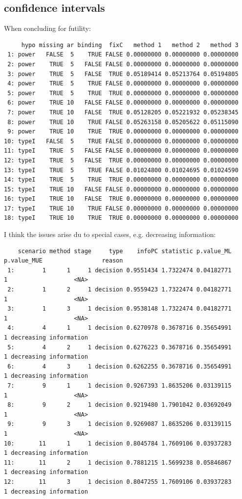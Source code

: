 \documentclass[12pt]{article}
\begin{document}
\clearpage

\subsection{confidence intervals}
\label{sec:org68589e6}

When concluding for futility:
\begin{verbatim}
     hypo missing ar binding  fixC   method 1   method 2   method 3
 1: power   FALSE  5    TRUE FALSE 0.00000000 0.00000000 0.00000000
 2: power    TRUE  5   FALSE FALSE 0.00000000 0.00000000 0.00000000
 3: power    TRUE  5   FALSE  TRUE 0.05189414 0.05213764 0.05194805
 4: power    TRUE  5    TRUE FALSE 0.00000000 0.00000000 0.00000000
 5: power    TRUE  5    TRUE  TRUE 0.00000000 0.00000000 0.00000000
 6: power    TRUE 10   FALSE FALSE 0.00000000 0.00000000 0.00000000
 7: power    TRUE 10   FALSE  TRUE 0.05128205 0.05221932 0.05238345
 8: power    TRUE 10    TRUE FALSE 0.05263158 0.05205622 0.05115090
 9: power    TRUE 10    TRUE  TRUE 0.00000000 0.00000000 0.00000000
10: typeI   FALSE  5    TRUE FALSE 0.00000000 0.00000000 0.00000000
11: typeI    TRUE  5   FALSE FALSE 0.00000000 0.00000000 0.00000000
12: typeI    TRUE  5   FALSE  TRUE 0.00000000 0.00000000 0.00000000
13: typeI    TRUE  5    TRUE FALSE 0.01024800 0.01024695 0.01024590
14: typeI    TRUE  5    TRUE  TRUE 0.00000000 0.00000000 0.00000000
15: typeI    TRUE 10   FALSE FALSE 0.00000000 0.00000000 0.00000000
16: typeI    TRUE 10   FALSE  TRUE 0.00000000 0.00000000 0.00000000
17: typeI    TRUE 10    TRUE FALSE 0.00000000 0.00000000 0.00000000
18: typeI    TRUE 10    TRUE  TRUE 0.00000000 0.00000000 0.00000000
\end{verbatim}

I think the issues arise du to special cases, e.g. decreasing
information:
\begin{verbatim}
    scenario method stage     type    infoPC statistic p.value_ML p.value_MUE                 reason
 1:        1      1     1 decision 0.9551434 1.7322474 0.04182771           1                   <NA>
 2:        1      2     1 decision 0.9559423 1.7322474 0.04182771           1                   <NA>
 3:        1      3     1 decision 0.9538148 1.7322474 0.04182771           1                   <NA>
 4:        4      1     1 decision 0.6270978 0.3678716 0.35654991           1 decreasing information
 5:        4      2     1 decision 0.6276223 0.3678716 0.35654991           1 decreasing information
 6:        4      3     1 decision 0.6262255 0.3678716 0.35654991           1 decreasing information
 7:        9      1     1 decision 0.9267393 1.8635206 0.03139115           1                   <NA>
 8:        9      2     1 decision 0.9219480 1.7901042 0.03692049           1                   <NA>
 9:        9      3     1 decision 0.9269087 1.8635206 0.03139115           1                   <NA>
10:       11      1     1 decision 0.8045784 1.7609106 0.03937283           1 decreasing information
11:       11      2     1 decision 0.7881215 1.5699238 0.05846867           1 decreasing information
12:       11      3     1 decision 0.8047255 1.7609106 0.03937283           1 decreasing information
\end{verbatim}
\end{document}
